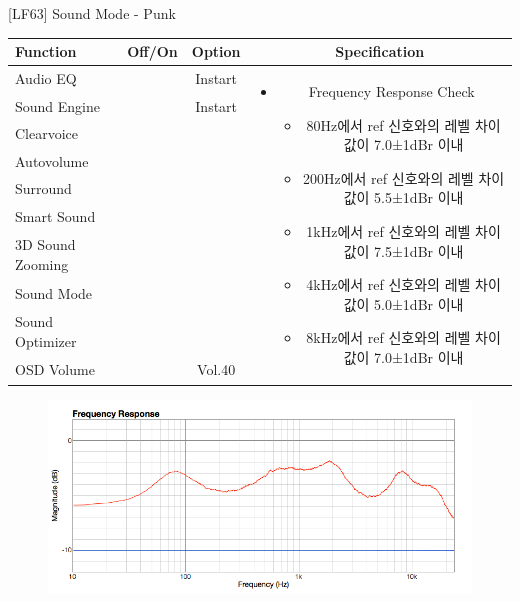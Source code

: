 \begin{frame}[t]{[LF63] Sound Mode - Punk}
\begin{tiny}
\begin{tabular}{@{}lccc@{}}
\toprule
Function & Off/On & Option & Specification \\
\midrule
Audio EQ & \color{black}{Off} & Instart &
\multirow{10}{60mm}{
\begin{itemize}
\item Frequency Response Check
	\begin{itemize}
	\item 80Hz에서 ref 신호와의 레벨 차이값이 7.0±1dBr 이내
	\item 200Hz에서 ref 신호와의 레벨 차이값이 5.5±1dBr 이내
	\item 1kHz에서 ref 신호와의 레벨 차이값이 7.5±1dBr 이내
	\item 4kHz에서 ref 신호와의 레벨 차이값이 5.0±1dBr 이내
	\item 8kHz에서 ref 신호와의 레벨 차이값이 7.0±1dBr 이내
	\end{itemize}
\end{itemize}
} \\
Sound Engine & \color{blue}{On} & Instart & \\
Clearvoice & \color{black}{Off} & & \\
Autovolume & \color{black}{Off} & & \\
Surround & \color{black}{Off} & & \\
Smart Sound & \color{black}{Off} & & \\
3D Sound Zooming & \color{black}{Off} & & \\
Sound Mode & \color{blue}{On} & \color{blue}{Punk} & \\
Sound Optimizer & \color{black}{Off} & & \\
OSD Volume & \color{blue}{On} & Vol.40 & \\
\midrule
\end{tabular}
\end{tiny}

\begin{figure}[b]
\includegraphics[height=0.4\textwidth]{figures/punk.png}
\end{figure}

\end{frame}
